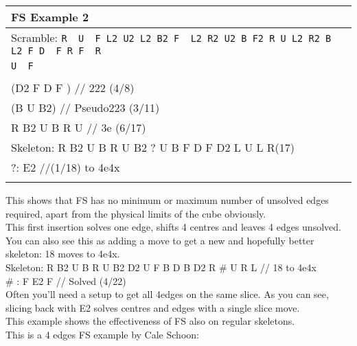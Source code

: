 \documentclass[11pt,a4paper]{book}
\newcommand{\p}{\textquotesingle}
\newcommand{\m}{\texttt}
\newcommand{\ps}{\p\,\,}
\newcommand{\comment}[1]{{\color{gray}\quad//#1}}
\begin{document}
\bigskip
\begin{tabular}{|l|}
\hline
\textbf{FS Example 2}\\
\hline
Scramble: \m{R\ps U\ps F L2 U2 L2 B2 F\ps L2 R2 U2 B F2 R U L2 R2 B\ps L2 F D\ps F R F\ps R\ps }\\ \m{U\ps F}\\
\hline
\begin{minipage}[l]{0.650\textwidth}
\bigskip
\m{
(R\ps L\ps U L) \comment{ EO + square (4/4)}\\
(D2 F\ps D\ps F\ps) \comment{  222 (4/8)}\\
(B\ps U B2) \comment{  Pseudo223 (3/11)} \\
R B2 U\ps B\ps R U\ps \comment{ 3e (6/17) }\\
\newline
Skeleton: R B2 U\ps B\ps R U\ps B2 ?  U\ps B F D F D2 L\ps U\ps L R(17)\\
?: E2 \comment{(1/18) to 4e4x}\\
}
\bigskip
\end{minipage}
\begin{minipage}[c]{0.25\textwidth}
\centering
\def\svgwidth{\columnwidth}

\end{minipage}\\
\hline
\end{tabular}
\bigskip
\newline
This shows that FS has no minimum or maximum number of unsolved edges required, apart from the physical limits of the cube obviously.\\
This first insertion solves one edge, shifts 4 centres and leaves 4 edges unsolved. You can also see this as adding a move to get a new and hopefully better skeleton: 18 moves to 4e4x.\\
\newline
Skeleton:  R B2 U\ps B\ps R U\ps B2 D2 U F B D B D2 R\ps \# U\ps R L \comment{ 18 to 4e4x}\\
\# : F E2 F\ps \comment{ Solved (4/22)}\\
\newline
Often you'll need a setup to get all 4edges on the same slice. As you can see, slicing back with E2 solves centres and edges with a single slice move.\\
This example shows the effectiveness of FS also on regular skeletons.\\
\newline
This is a 4 edges FS example by Cale Schoon:\\
\end{document}
